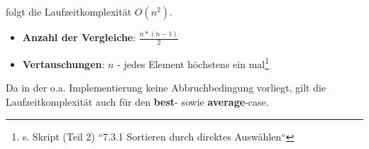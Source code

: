 \noindent
folgt die Laufzeitkomplexität $O(n^2)$.\\

\begin{itemize}
    \item \textbf{Anzahl der Vergleiche}: $\frac{n * ( n - 1)}{2}$
    \item \textbf{Vertauschungen}: $n$ - jedes Element höchstens ein mal\footnote{s. Skript (Teil 2) ``7.3.1 Sortieren durch direktes Auswählen``
    }
\end{itemize}

\noindent
Da in der o.a. Implementierung keine Abbruchbedingung vorliegt, gilt die Laufzeitkomplexität auch für den \textbf{best}- sowie \textbf{average}-case.

